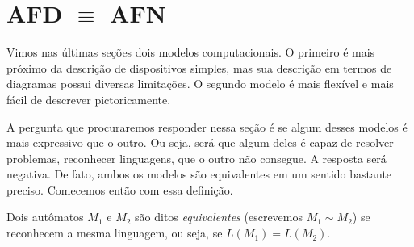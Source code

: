 \section{AFD $\equiv$ AFN}
\label{sec:afn-afd}

Vimos nas últimas seções dois modelos computacionais.
O primeiro é mais próximo da descrição de dispositivos simples, mas sua descrição em termos de diagramas possui diversas limitações.
O segundo modelo é mais flexível e mais fácil de descrever pictoricamente.

A pergunta que procuraremos responder nessa seção é se algum desses modelos é mais expressivo que o outro.
Ou seja, será que algum deles é capaz de resolver problemas, reconhecer linguagens, que o outro não consegue.
A resposta será negativa.
De fato, ambos os modelos são equivalentes em um sentido bastante preciso.
Comecemos então com essa definição.

Dois autômatos $M_1$ e $M_2$ são ditos {\em equivalentes} (escrevemos $M_1 \sim M_2$) se reconhecem a mesma linguagem, ou seja, se $L(M_1) = L(M_2)$.

